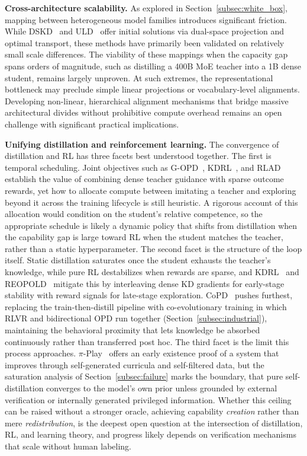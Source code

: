 \documentclass{article} %
\begin{document}
\textbf{Cross-architecture scalability.} As explored in Section~\ref{subsec:white_box}, mapping between heterogeneous model families introduces significant friction. While DSKD~\citep{2504.11426} and ULD~\citep{2402.12030} offer initial solutions via dual-space projection and optimal transport, these methods have primarily been validated on relatively small scale differences. The viability of these mappings when the capacity gap spans orders of magnitude, such as distilling a 400B MoE teacher into a 1B dense student, remains largely unproven. At such extremes, the representational bottleneck may preclude simple linear projections or vocabulary-level alignments. Developing non-linear, hierarchical alignment mechanisms that bridge massive architectural divides without prohibitive compute overhead remains an open challenge with significant practical implications.

\textbf{Unifying distillation and reinforcement learning.} The convergence of distillation and RL has three facets best understood together. The first is temporal scheduling. Joint objectives such as G-OPD~\citep{2602.12125}, KDRL~\citep{2506.02208}, and RLAD~\citep{2602.22495} establish the value of combining dense teacher guidance with sparse outcome rewards, yet how to allocate compute between imitating a teacher and exploring beyond it across the training lifecycle is still heuristic. A rigorous account of this allocation would condition on the student's relative competence, so the appropriate schedule is likely a dynamic policy that shifts from distillation when the capability gap is large toward RL when the student matches the teacher, rather than a static hyperparameter. The second facet is the structure of the loop itself. Static distillation saturates once the student exhausts the teacher's knowledge, while pure RL destabilizes when rewards are sparse, and KDRL~\citep{2506.02208} and REOPOLD~\citep{2603.11137} mitigate this by interleaving dense KD gradients for early-stage stability with reward signals for late-stage exploration. CoPD~\citep{2604.27083} pushes furthest, replacing the train-then-distill pipeline with co-evolutionary training in which RLVR and bidirectional OPD run together (Section~\ref{subsec:industrial}), maintaining the behavioral proximity that lets knowledge be absorbed continuously rather than transferred post hoc. The third facet is the limit this process approaches. $\pi$-Play~\citep{2604.14054} offers an early existence proof of a system that improves through self-generated curricula and self-filtered data, but the saturation analysis of Section~\ref{subsec:failure} marks the boundary, that pure self-distillation converges to the model's own prior unless grounded by external verification or internally generated privileged information. Whether this ceiling can be raised without a stronger oracle, achieving capability \emph{creation} rather than mere \emph{redistribution}, is the deepest open question at the intersection of distillation, RL, and learning theory, and progress likely depends on verification mechanisms that scale without human labeling.
\end{document}
